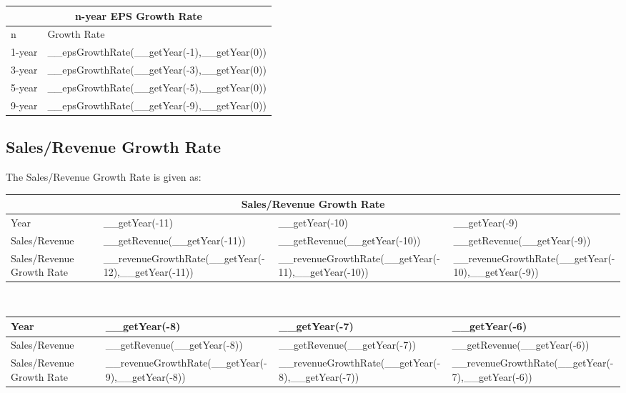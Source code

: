 \begin{tabularx}{\textwidth}{|X|X|}
 \hline
 \multicolumn{2}{|c|}{n-year EPS Growth Rate} \\
 \hline
 n & Growth Rate\\
 \hline
 1-year & __epsGrowthRate(__getYear(-1),__getYear(0)) \\
 3-year & __epsGrowthRate(__getYear(-3),__getYear(0)) \\
 5-year & __epsGrowthRate(__getYear(-5),__getYear(0)) \\
 9-year & __epsGrowthRate(__getYear(-9),__getYear(0)) \\
 \hline
\end{tabularx}

\subsection{Sales/Revenue Growth Rate}

The Sales/Revenue Growth Rate is given as:\\

\begin{tabularx}{\textwidth}{|X|X|X|X|}
 \hline
 \multicolumn{4}{|c|}{Sales/Revenue Growth Rate} \\
 \hline
 Year                                           & __getYear(-11)                                     & __getYear(-10)                                     & __getYear(-9)                                     \\
 \hline
 Sales/Revenue                                  & __getRevenue(__getYear(-11))                       & __getRevenue(__getYear(-10))                       & __getRevenue(__getYear(-9))                       \\
 \rowcolor{lightgray} Sales/Revenue Growth Rate & __revenueGrowthRate(__getYear(-12),__getYear(-11)) & __revenueGrowthRate(__getYear(-11),__getYear(-10)) & __revenueGrowthRate(__getYear(-10),__getYear(-9)) \\
 \hline
\end{tabularx}\\

\begin{tabularx}{\textwidth}{|X|X|X|X|}
 \hline
 Year                                           & __getYear(-8)                                     & __getYear(-7)                                     & __getYear(-6)                                     \\
 \hline
 Sales/Revenue                                  & __getRevenue(__getYear(-8))                       & __getRevenue(__getYear(-7))                       & __getRevenue(__getYear(-6))                       \\
 \rowcolor{lightgray} Sales/Revenue Growth Rate & __revenueGrowthRate(__getYear(-9),__getYear(-8))  & __revenueGrowthRate(__getYear(-8),__getYear(-7))  & __revenueGrowthRate(__getYear(-7),__getYear(-6))  \\
 \hline
\end{tabularx}\\

